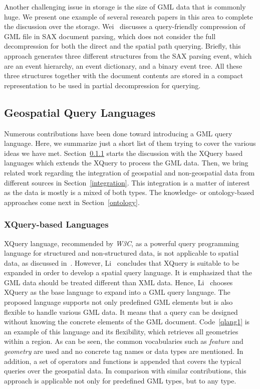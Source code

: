 \documentclass[a4paper,12pt]{article}
\begin{document}
Another challenging issue in storage is the size of GML data that is commonly huge. 
We present one example of several research papers in this area to complete the discussion over the storage.
Wei~\cite{Wei2011} discusses a query-friendly compression of GML file in SAX document 
parsing, which does not consider the full decompression for both the direct and the spatial path querying. 
Briefly, this approach generates three different structures from the SAX parsing event,
which are an event hierarchy, an event dictionary, and a binary event tree.
All these three structures together with the document contents are stored in a compact
representation to be used in partial decompression for querying.%

\subsection{Geospatial Query Languages}
\label{queryLang}
Numerous contributions have been done toward introducing a GML query language.
Here, we summarize just a short list of them trying to cover the various ideas we have met. %
Section~\ref{xquery-based} starts the discussion with the XQuery based languages which extends the XQuery
to process the GML data.
Then, we bring related work regarding the integration of geospatial and non-geospatial
data from different sources in Section~\ref{integration}. This integration is a matter of interest
as the data is mostly is a mixed of both types. The knowledge- or ontology-based approaches 
come next in Section~\ref{ontology}.

\subsubsection{XQuery-based Languages}
\label{xquery-based}
XQuery language, recommended by \emph{W3C}, as a powerful query programming language for structured and non-structured data, 
is not applicable to spatial data, as discussed in~\cite{Lisa2006,Chen2010}. 
However, Li~\cite{Lisa2006} concludes that XQuery is suitable to be expanded in order to develop a spatial query language.
It is emphasized that the GML data should be treated different than XML data. Hence, Li~\cite{Lisa2006} chooses XQuery as the base language to expand into a GML query language. The proposed language supports not only predefined GML elements but is also flexible to handle various GML data. 
It means that a query can be designed without knowing the concrete elements of the GML document.
Code~\ref{qlang1} is an example of this language and its flexibility,
which retrieves all geometries within a region. As can be seen, 
the common vocabularies such as \textit{feature} and \textit{geometry} are used and no concrete tag names or data types are mentioned.
In addition, a set of operators and functions is appended that covers the typical queries over the geospatial data. 
In comparison with similar contributions, this approach is applicable not only for predefined GML types, but to any type.
\end{document}
